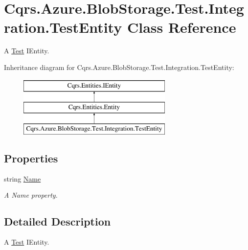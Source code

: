 \hypertarget{classCqrs_1_1Azure_1_1BlobStorage_1_1Test_1_1Integration_1_1TestEntity}{}\section{Cqrs.\+Azure.\+Blob\+Storage.\+Test.\+Integration.\+Test\+Entity Class Reference}
\label{classCqrs_1_1Azure_1_1BlobStorage_1_1Test_1_1Integration_1_1TestEntity}


A \hyperlink{namespaceCqrs_1_1Azure_1_1BlobStorage_1_1Test}{Test} I\+Entity.  


Inheritance diagram for Cqrs.\+Azure.\+Blob\+Storage.\+Test.\+Integration.\+Test\+Entity\+:\begin{figure}[H]
\begin{center}
\leavevmode
\includegraphics[height=3.000000cm]{classCqrs_1_1Azure_1_1BlobStorage_1_1Test_1_1Integration_1_1TestEntity}
\end{center}
\end{figure}
\subsection*{Properties}
\begin{DoxyCompactItemize}
\item 
string \hyperlink{classCqrs_1_1Azure_1_1BlobStorage_1_1Test_1_1Integration_1_1TestEntity_aad584f6a6399f936b17e6367ebf30b3d_aad584f6a6399f936b17e6367ebf30b3d}{Name}
\begin{DoxyCompactList}\small\item\em A Name property. \end{DoxyCompactList}\end{DoxyCompactItemize}


\subsection{Detailed Description}
A \hyperlink{namespaceCqrs_1_1Azure_1_1BlobStorage_1_1Test}{Test} I\+Entity. 



